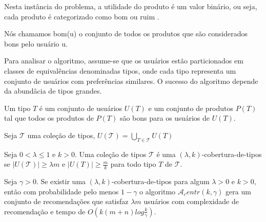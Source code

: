 \documentclass[a4paper,10pt]{article}
\begin{document}
Nesta instância do problema, a utilidade do produto é um valor binário, ou seja, cada produto é categorizado como bom ou ruim .

Nós chamamos bom(u) o conjunto de todos os produtos que são considerados bons pelo usuário u.

Para analisar o algoritmo, assume-se que os usuários estão particionados em classes de equivalências denominadas tipos, onde cada tipo representa um conjunto de usuários com preferências similares. O sucesso do algoritmo depende da abundâcia de tipos grandes. 

\begin{definicao}
Um tipo $T$ é um conjunto de usuários $U(T)$ e um conjunto de produtos $P(T)$ tal que todos os produtos de $P(T)$ são bons para os usuários de $U(T)$.
\end{definicao}

\begin{definicao}
Seja $\mathcal{T}$ uma coleção de tipos, $U(\mathcal{T}) = \bigcup _{T \in \mathcal{T}} U(T)$ 
\end{definicao}

\begin{definicao}
Seja $0 < \lambda \leq 1$ e $k > 0$. Uma coleção de tipos $\mathcal{T}$ é uma $(\lambda, k)$-cobertura-de-tipos se $\vert U(\mathcal{T}) \vert \geq \lambda m$ e $\vert  U(T) \vert \geq \frac{m}{k}$ para todo tipo $T$ de $\mathcal{T}$. 
\end{definicao}


\begin{teo}
  Seja $\gamma > 0 $. Se existir uma $(\lambda, k)$-cobertura-de-tipos para algum $\lambda > 0 $ e $k > 0$, então com probabilidade pelo menos $1 - \gamma$ o algoritmo $\mathcal{A}_centr(k, \gamma)$ gera um conjunto de recomendações que satisfaz $\lambda m$ usuários com complexidade de recomendação e tempo de $O(k(m+n)log\frac{k}{\gamma})$.
\end{teo}



\end{document}
